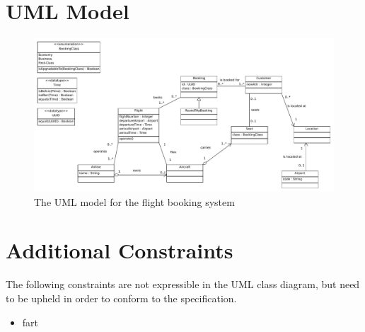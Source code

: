 \documentclass[12pt,a4paper,titlepage]{article}
\title{\doctitle}
\author{\docauthor}
\date{\d_mny\today}
\begin{document}
\begin{center}{\bfseries\Huge\doctitle}\end{center}
\section{UML Model}

\begin{figure}[H]
  \includegraphics[width=\textwidth]{ClassDiagram}
  \caption{The UML model for the flight booking system}
\end{figure}

\section{Additional Constraints}
The following constraints are not expressible in the UML class diagram, but need to be upheld in order to conform to the specification.

\begin{itemize}
  \item fart
\end{itemize}
\end{document}
